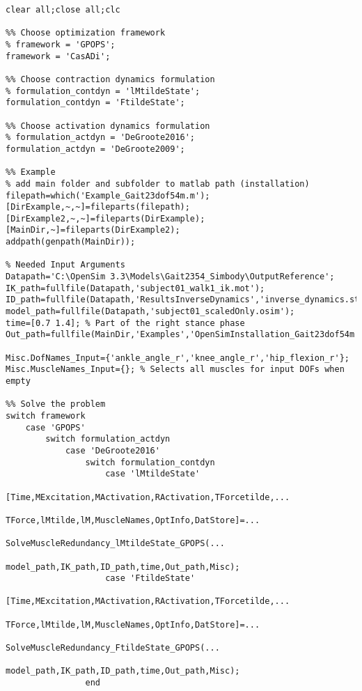 \documentclass[a4paper,oneside,11pt]{article}
\begin{document}
\begin{lstlisting}[frame=none,basicstyle=\tiny]
clear all;close all;clc

%% Choose optimization framework
% framework = 'GPOPS';
framework = 'CasADi';

%% Choose contraction dynamics formulation
% formulation_contdyn = 'lMtildeState';
formulation_contdyn = 'FtildeState';

%% Choose activation dynamics formulation
% formulation_actdyn = 'DeGroote2016';
formulation_actdyn = 'DeGroote2009';

%% Example
% add main folder and subfolder to matlab path (installation)
filepath=which('Example_Gait23dof54m.m'); 
[DirExample,~,~]=fileparts(filepath); 
[DirExample2,~,~]=fileparts(DirExample); 
[MainDir,~]=fileparts(DirExample2);
addpath(genpath(MainDir));

% Needed Input Arguments
Datapath='C:\OpenSim 3.3\Models\Gait2354_Simbody\OutputReference';
IK_path=fullfile(Datapath,'subject01_walk1_ik.mot');
ID_path=fullfile(Datapath,'ResultsInverseDynamics','inverse_dynamics.sto');
model_path=fullfile(Datapath,'subject01_scaledOnly.osim');
time=[0.7 1.4]; % Part of the right stance phase
Out_path=fullfile(MainDir,'Examples','OpenSimInstallation_Gait23dof54m','Results');

Misc.DofNames_Input={'ankle_angle_r','knee_angle_r','hip_flexion_r'};
Misc.MuscleNames_Input={}; % Selects all muscles for input DOFs when empty

%% Solve the problem
switch framework
    case 'GPOPS'
        switch formulation_actdyn
            case 'DeGroote2016'     
                switch formulation_contdyn
                    case 'lMtildeState'
                        [Time,MExcitation,MActivation,RActivation,TForcetilde,...
                            TForce,lMtilde,lM,MuscleNames,OptInfo,DatStore]=...
                            SolveMuscleRedundancy_lMtildeState_GPOPS(...
                            model_path,IK_path,ID_path,time,Out_path,Misc);
                    case 'FtildeState'   
                        [Time,MExcitation,MActivation,RActivation,TForcetilde,...
                            TForce,lMtilde,lM,MuscleNames,OptInfo,DatStore]=...
                            SolveMuscleRedundancy_FtildeState_GPOPS(...
                            model_path,IK_path,ID_path,time,Out_path,Misc);
                end


\end{lstlisting}
\end{document}
